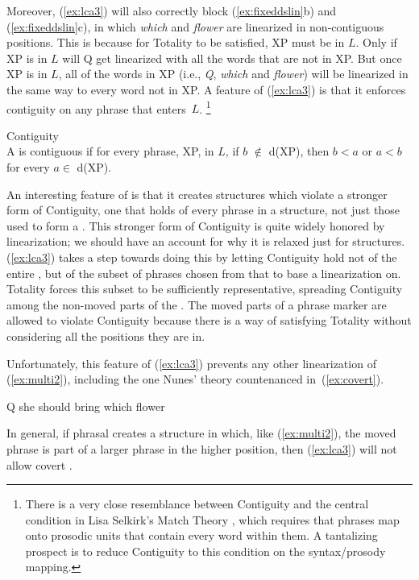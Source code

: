 \documentclass[output=paper]{langsci/langscibook}
\begin{document}
Moreover, (\ref{ex:lca3}) will also correctly block (\ref{ex:fixeddslin}b) and
(\ref{ex:fixeddslin}c), in which \emph{which} and \emph{flower} are linearized
in non-contiguous positions. This is because for Totality to be satisfied, XP
must be in $L$. Only if XP is in $L$ will Q get linearized with all the words
that are not in XP. But once XP is in $L$, all of the words in XP (i.e.,
\emph{Q}, \emph{which} and \emph{flower}) will be linearized in the same way to
every word not in XP. A feature of (\ref{ex:lca3}) is that it enforces
contiguity on any phrase that enters~$L$.  \footnote{There is a very close
resemblance between Contiguity and the central condition in Lisa Selkirk's
Match Theory \citep{Selkirk2011}, which requires that phrases map onto
prosodic units that contain every word within them. A tantalizing prospect is
to reduce Contiguity to this condition on the syntax/prosody mapping.} %
\begin{exe}
	\ex \label{ex:contiguity} Contiguity\\
	A  is contiguous if for every phrase, XP, in $L$, if $b$ $\notin$ d(XP), then $b<a$ or $a<b$ for every $a \in$ d(XP).
\end{exe}

An interesting feature of  is that it creates structures which violate
a stronger form of Contiguity, one that holds of every phrase in a structure,
not just those used to form a . This stronger form of Contiguity
is quite widely honored by linearization; we should have an account for why it
is relaxed just for  structures. (\ref{ex:lca3}) takes a step towards
doing this by letting Contiguity hold not of the entire , but of
the subset of phrases chosen from that  to base a linearization
on. Totality forces this subset to be sufficiently representative, spreading
Contiguity among the non-moved parts of the . The moved parts of a
phrase marker are allowed to violate Contiguity because there is a way of
satisfying Totality without considering all the positions they are in.

Unfortunately, this feature of (\ref{ex:lca3}) prevents any other linearization
of (\ref{ex:multi2}), including the one Nunes' theory countenanced
in~(\ref{ex:covert}).
\begin{exe}
	\ex \label{ex:covert} Q she should bring which flower
\end{exe}

In general, if phrasal  creates a structure in which, like
(\ref{ex:multi2}), the moved phrase is part of a larger phrase in the higher
position, then (\ref{ex:lca3}) will not allow covert .
\end{document}
